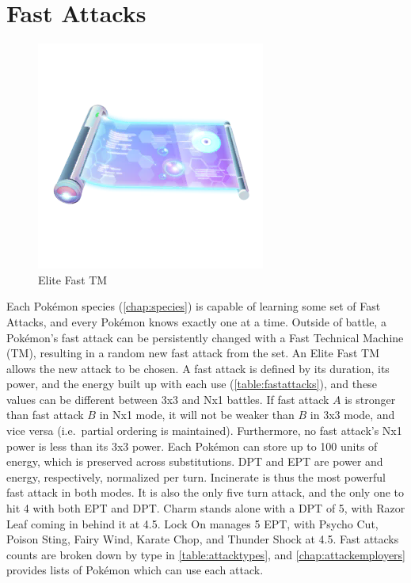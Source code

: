 \section{Fast Attacks}
\begin{figure}
  \centering
  \vspace{-\intextsep}
  \includegraphics[width=.25\textwidth]{images/elitefasttm.png}
  \caption*{Elite Fast TM}
\end{figure}
Each Pokémon species (\autoref{chap:species}) is capable of learning some set of Fast Attacks, 
  and every Pokémon knows exactly one at a time.
Outside of battle, a Pokémon's fast attack can be persistently changed with a
  Fast Technical Machine (TM), resulting in a random new fast attack from the set.
An Elite Fast TM allows the new attack to be chosen.
A fast attack is defined by its duration, its power, and the energy built up with each use (\autoref{table:fastattacks}),
  and these values can be different between 3x3 and Nx1 battles.
If fast attack $A$ is stronger than fast attack $B$ in Nx1 mode, it will not be
  weaker than $B$ in 3x3 mode, and vice versa (i.e.\ partial ordering is maintained).
Furthermore, no fast attack's Nx1 power is less than its 3x3 power.
Each Pokémon can store up to 100 units of energy, which is preserved across substitutions.
DPT and EPT are power and energy, respectively, normalized per turn.
Incinerate is thus the most powerful fast attack in both modes.
It is also the only five turn attack, and the only one to hit 4 with both EPT and DPT\@.
Charm stands alone with a DPT of 5, with Razor Leaf coming in behind it at 4.5.
Lock On manages 5 EPT, with Psycho Cut, Poison Sting, Fairy Wind, Karate Chop,
  and Thunder Shock at 4.5.
Fast attacks counts are broken down by type in \autoref{table:attacktypes},
 and \autoref{chap:attackemployers} provides lists of Pokémon which can use each attack.



